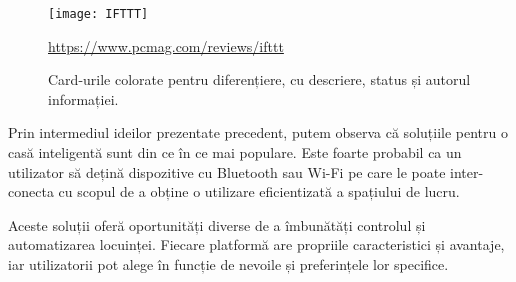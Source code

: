 \begin{figure}[h]
	\centering
	\texttt{[image: IFTTT]}
	\caption{Card-urile colorate pentru diferențiere, cu descriere, status și autorul informației.}\url{https://www.pcmag.com/reviews/ifttt}
	\label{fig:ifttt}
\end{figure}

\break
\hfill

\hfill

Prin intermediul ideilor prezentate precedent, putem observa că soluțiile pentru o casă inteligentă sunt din ce în ce mai populare. Este foarte probabil ca un utilizator să dețină dispozitive cu Bluetooth sau Wi-Fi pe care le poate inter-conecta cu scopul de a obține o utilizare eficientizată a spațiului de lucru.

Aceste soluții oferă oportunități diverse de a îmbunătăți controlul și automatizarea locuinței. Fiecare platformă are propriile caracteristici și avantaje, iar utilizatorii pot alege în funcție de nevoile și preferințele lor specifice.